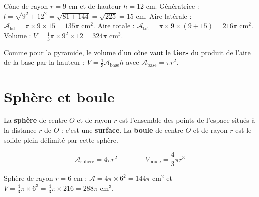 \begin{exemple}
Cône de rayon $r=9$ cm et de hauteur $h=12$ cm.
Génératrice : $l=\sqrt{9^{2}+12^{2}}=\sqrt{81+144}=\sqrt{225}=15$ cm.
Aire latérale : $\mathcal{A}_{\text{lat}}=\pi\times9\times15=135\pi$ cm$^{2}$.
Aire totale : $\mathcal{A}_{\text{tot}}=\pi\times9\times(9+15)=216\pi$ cm$^{2}$.
Volume : $V=\frac{1}{3}\pi\times9^{2}\times12=324\pi$ cm$^{3}$.
\end{exemple}

\begin{remarque}
Comme pour la pyramide, le volume d'un cône vaut le \textbf{tiers} du produit de l'aire de
la base par la hauteur : $V=\frac13\mathcal{A}_{\text{base}}h$ avec $\mathcal{A}_{\text{base}}=\pi r^{2}$.
\end{remarque}

\section{Sphère et boule}

\begin{definition}
La \textbf{sphère} de centre $O$ et de rayon $r$ est l'ensemble des points de l'espace
situés à la distance $r$ de $O$ : c'est une \textbf{surface}. La \textbf{boule} de centre
$O$ et de rayon $r$ est le solide plein délimité par cette sphère.
\end{definition}

\begin{propriete}
\[
\mathcal{A}_{\text{sphère}}=4\pi r^{2} \qquad\qquad V_{\text{boule}}=\frac{4}{3}\pi r^{3}
\]
\end{propriete}

\begin{illus}
\end{illus}

\begin{exemple}
Sphère de rayon $r=6$ cm : $\mathcal{A}=4\pi\times6^{2}=144\pi$ cm$^{2}$ et
$V=\frac{4}{3}\pi\times6^{3}=\frac{4}{3}\pi\times216=288\pi$ cm$^{3}$.
\end{exemple}

